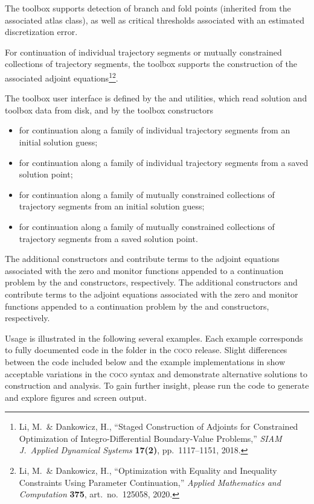The  toolbox supports detection of branch and fold points (inherited from the associated atlas class), as well as critical thresholds associated with an estimated discretization error.

For continuation of individual trajectory segments or mutually constrained collections of trajectory segments, the  toolbox supports the construction of the associated adjoint equations\footnote{Li, M.~\& Dankowicz, H., ``Staged Construction of Adjoints for Constrained Optimization of Integro-Differential Boundary-Value Problems,'' \emph{SIAM J.~Applied Dynamical Systems} \textbf{17(2)}, pp.~1117--1151, 2018.}\footnote{Li, M.~\& Dankowicz, H., ``Optimization with Equality and Inequality Constraints Using Parameter Continuation,'' \emph{Applied Mathematics and Computation} \textbf{375}, art.~no.~125058, 2020.}.

The toolbox user interface is defined by the  and  utilities, which read solution and toolbox data from disk, and by the toolbox constructors
\begin{itemize}
\item  {} for continuation along a family of individual trajectory segments from an initial solution guess;
\item {} for continuation along a family of individual trajectory segments from a saved solution point;
\item {} for continuation along a family of mutually constrained collections of trajectory segments from an initial solution guess;
\item {} for continuation along a family of mutually constrained collections of trajectory segments from a saved solution point.
\end{itemize}
The additional constructors  and  contribute terms to the adjoint equations associated with the zero and monitor functions appended to a continuation problem by the  and  constructors, respectively.  The additional constructors  and  contribute terms to the adjoint equations associated with the zero and monitor functions appended to a continuation problem by the  and  constructors, respectively. 

Usage is illustrated in the following several examples. Each example corresponds to fully documented code in the  folder in the \textsc{coco} release. Slight differences between the code included below and the example implementations in  show acceptable variations in the \textsc{coco} syntax and demonstrate alternative solutions to construction and analysis. To gain further insight, please run the code to generate and explore figures and screen output.

